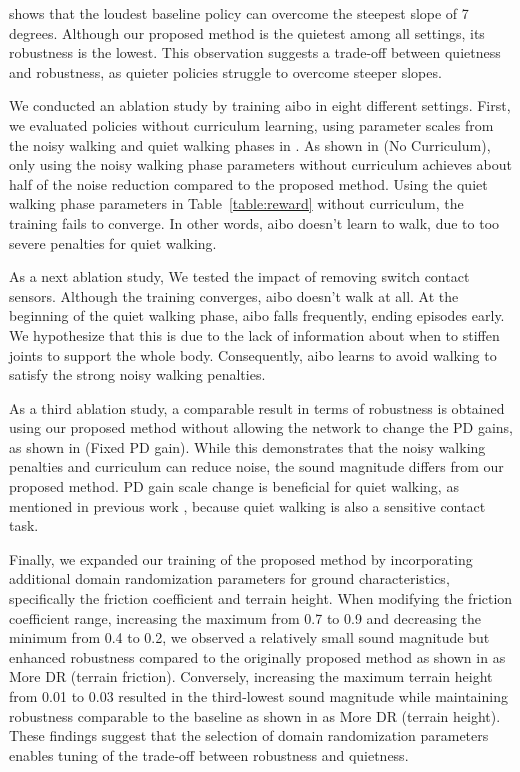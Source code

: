  shows that the loudest baseline policy can overcome the steepest slope of 7 degrees. Although our proposed method is the quietest among all settings, its robustness is the lowest. This observation suggests a trade-off between quietness and robustness, as quieter policies struggle to overcome steeper slopes.

We conducted an ablation study by training aibo in eight different settings. First, we evaluated policies without curriculum learning, using parameter scales from the noisy walking and quiet walking phases in . As shown in  (No Curriculum), only using the noisy walking phase parameters without curriculum achieves about half of the noise reduction compared to the proposed method. Using the quiet walking phase parameters in Table~\ref{table:reward} without curriculum, the training fails to converge. In other words, aibo doesn't learn to walk, due to too severe penalties for quiet walking. 

As a next ablation study, We tested the impact of removing switch contact sensors. Although the training converges, aibo doesn't walk at all. At the beginning of the quiet walking phase, aibo falls frequently, ending episodes early. We hypothesize that this is due to the lack of information about when to stiffen joints to support the whole body. Consequently, aibo learns to avoid walking to satisfy the strong noisy walking penalties.

As a third ablation study, a comparable result in terms of robustness is obtained using our proposed method without allowing the network to change the PD gains, as shown in  (Fixed PD gain). While this demonstrates that the noisy walking penalties and curriculum can reduce noise, the sound magnitude differs from our proposed method. PD gain scale change is beneficial for quiet walking, as mentioned in previous work \cite{bogdanovic2020learning}, because quiet walking is also a sensitive contact task.

Finally, we expanded our training of the proposed method by incorporating additional domain randomization parameters for ground characteristics, specifically the friction coefficient and terrain height. When modifying the friction coefficient range, increasing the maximum from 0.7 to 0.9 and decreasing the minimum from 0.4 to 0.2, we observed a relatively small sound magnitude but enhanced robustness compared to the originally proposed method as shown in  as More DR (terrain friction). Conversely, increasing the maximum terrain height from 0.01 to 0.03 resulted in the third-lowest sound magnitude while maintaining robustness comparable to the baseline as shown in  as More DR (terrain height). These findings suggest that the selection of domain randomization parameters enables tuning of the trade-off between robustness and quietness.

